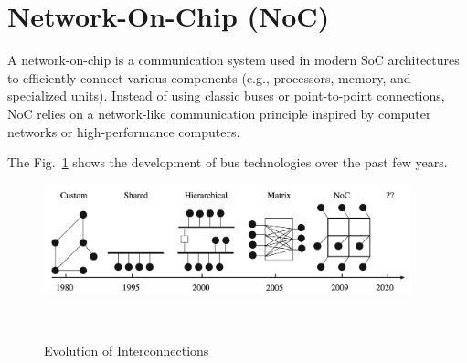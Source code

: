 \section{Network-On-Chip (NoC)}

A network-on-chip is a communication system used in modern \ac{SoC} architectures to efficiently connect various components (e.g., processors, memory, and specialized units). Instead of using classic buses or point-to-point connections, \ac{NoC} relies on a network-like communication principle inspired by computer networks or high-performance computers.\cite{serpanos_architecture_2011}

The Fig.~\ref{fig:Evolution_of_Interconnection} shows the development of bus technologies over the past few years.
\begin{figure}[htbp]
    \centering
    \includegraphics[width=0.95\textwidth]{img/Evolution of On-Chip communication interconnect.png}
    \caption{Evolution of Interconnections}~\cite{abderazek_multicore_2013}\label{fig:Evolution_of_Interconnection}
\end{figure}

